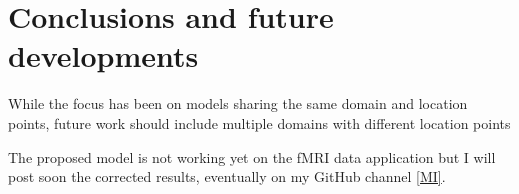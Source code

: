 
\chapter{Conclusions and future developments} \label{ch:Conclusions}

While the focus has been on models sharing the same domain and location points,
future work should include multiple domains with different location points

The proposed model is not working yet on the fMRI data application but I will
post soon the corrected results, eventually on my GitHub channel \ref{MI}.

%
